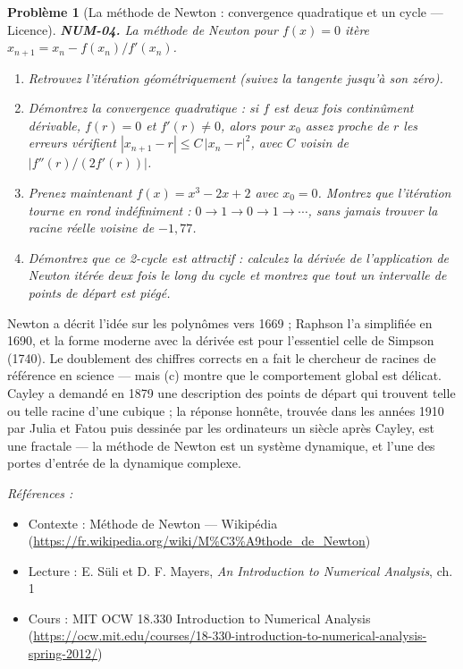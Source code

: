 \documentclass[11pt]{article}
\newtheorem{problem}{Problème}
\newenvironment{refs}{\par\small\noindent\emph{Références :}\begin{itemize}\setlength\itemsep{0pt}}{\end{itemize}\normalsize}
\begin{document}
\begin{problem}[{La méthode de Newton : convergence quadratique et un cycle --- Licence}]
\textbf{NUM-04.} La méthode de Newton pour $f(x) = 0$ itère
$x_{n+1} = x_n - f(x_n)/f'(x_n)$.
\begin{enumerate}
\item[(a)] Retrouvez l'itération géométriquement (suivez
la tangente jusqu'à son zéro).
\item[(b)] Démontrez la convergence quadratique : si $f$ est deux
fois continûment dérivable, $f(r) = 0$ et $f'(r) \ne 0$, alors pour $x_0$
assez proche de $r$ les erreurs vérifient $|x_{n+1} - r| \le C\,|x_n - r|^2$, avec
$C$ voisin de $|f''(r)/(2f'(r))|$.
\item[(c)] Prenez maintenant $f(x) = x^3 - 2x + 2$ avec
$x_0 = 0$. Montrez que l'itération tourne en rond indéfiniment :
$0 \to 1 \to 0 \to 1 \to \cdots$, sans jamais trouver la racine réelle voisine de
$-1{,}77$.
\item[(d)] Démontrez que ce 2-cycle est
\textit{attractif} : calculez la dérivée de l'application de Newton itérée deux fois le
long du cycle et montrez que tout un intervalle de points de départ est piégé.
\end{enumerate}

\end{problem}

\noindent Newton a décrit l'idée sur les polynômes vers 1669 ; Raphson l'a
simplifiée en 1690, et la forme moderne avec la dérivée est pour l'essentiel celle
de Simpson (1740). Le doublement des chiffres corrects en a fait le chercheur de
racines de référence en science --- mais (c) montre que le comportement global est
délicat. Cayley a demandé en 1879 une description des points de départ qui trouvent
telle ou telle racine d'une cubique ; la réponse honnête, trouvée dans les années
1910 par Julia et Fatou puis dessinée par les ordinateurs un siècle après Cayley, est
une fractale --- la méthode de Newton est un système dynamique, et l'une des portes
d'entrée de la dynamique complexe.

\begin{refs}
\item Contexte : Méthode de Newton --- Wikipédia (\url{https://fr.wikipedia.org/wiki/M%C3%A9thode_de_Newton})
\item Lecture : E. Süli et D. F. Mayers, \textit{An Introduction to Numerical Analysis}, ch. 1
\item Cours : MIT OCW 18.330 Introduction to Numerical Analysis (\url{https://ocw.mit.edu/courses/18-330-introduction-to-numerical-analysis-spring-2012/})
\end{refs}
\end{document}
